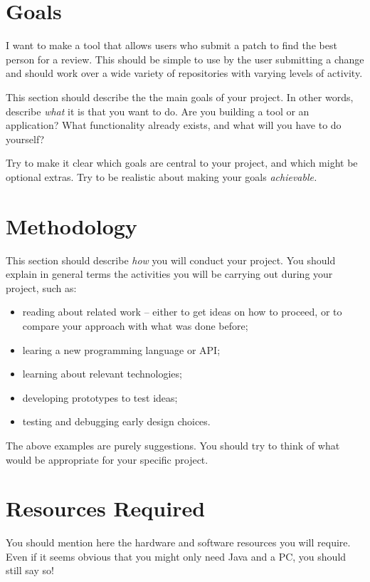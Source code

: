\documentclass[a4paper,12pt]{article}
\begin{document}
\section*{Goals}

I want to make a tool that allows users who submit a patch to find the best person for a review. This should be simple to use by the user submitting a change and should work over a wide variety of repositories with varying levels of activity.

This section should describe the the main goals of your project.
In other words, describe {\em what} it is that you want to do.
Are you building a tool or an application? What functionality 
already exists, and what will you have to do yourself?

Try to make it clear which goals are central to your project, and which
might be optional extras. Try to be realistic about making your
goals {\em achievable.}


\section*{Methodology}

This section should describe {\em how} you will conduct
your project. You should explain in general terms
the activities you will be carrying out during your project, such as:
%
\begin{itemize}
\item reading about related work -- either to get ideas on how to
      proceed, or to compare your approach with what was done before;
\item learing a new programming language or API;
\item learning about relevant technologies;
\item developing prototypes to test ideas;
\item testing and debugging early design choices.
\end{itemize}
%
The above examples are purely suggestions. You should try to think
of what would be appropriate for your specific project.

\section*{Resources Required}

You should mention here the hardware and software resources you will
require. Even if it seems obvious that you might only need Java and a PC, 
you should still say so!
\end{document}
